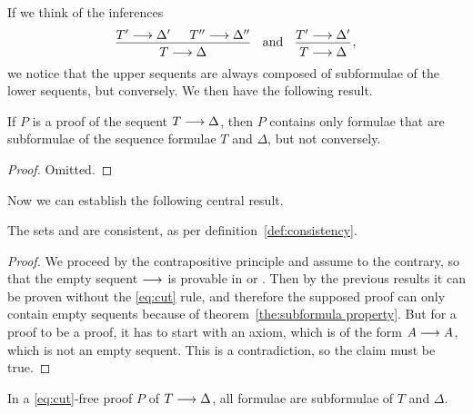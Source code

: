 \documentclass[11pt,a4paper]{article}
\begin{document}
If we think of the inferences
\begin{equation*}
    \begin{prooftree}
        \hypo{T'\seq\Delta'}
        \hypo{T''\seq\Delta''}
        \infer2{T\seq\Delta}
    \end{prooftree}
    \quad\text{and}\quad
    \begin{prooftree}
        \hypo{T'\seq\Delta'}
        \infer1{T\seq\Delta}
    \end{prooftree}\,,
\end{equation*}
we notice that the upper sequents are always composed of subformulae
of the lower sequents, but conversely. We then have the following result.

\begin{theorem}\label{the:subformula property}
    If \(P\) is a proof of the sequent \(T\longrightarrow\Delta\),
    then \(P\) contains only formulae that are subformulae of
    the sequence formulae \(T\) and \(\Delta\), but not conversely.
\end{theorem}

\begin{proof}
    Omitted.
\end{proof}

Now we can establish the following central result.

\begin{theorem}\label{eq:consistency of LK and LJ}
    The sets \LK{} and \LJ{} are consistent,
    as per definition~\ref{def:consistency}.
\end{theorem}

\begin{proof}
    We proceed by the contrapositive principle and
    assume to the contrary, so that the empty sequent \(\longrightarrow\)
    is provable in \LK{} or \LJ{}. Then by the previous results
    it can be proven without the \eqref{eq:cut} rule,
    and therefore the supposed proof can only contain empty sequents
    because of theorem~\ref{the:subformula property}.
    But for a proof to be a proof, it has to start with an
    axiom, which is of the form \(A\longrightarrow A\),
    which is not an empty sequent. This is a contradiction,
    so the claim must be true.
\end{proof}

\begin{theorem}\label{the:6.3}
    In a \eqref{eq:cut}-free proof \(P\) of \(T\longrightarrow\Delta\),
    all formulae are subformulae of \(T\) and \(\Delta\).
\end{theorem}
\end{document}
